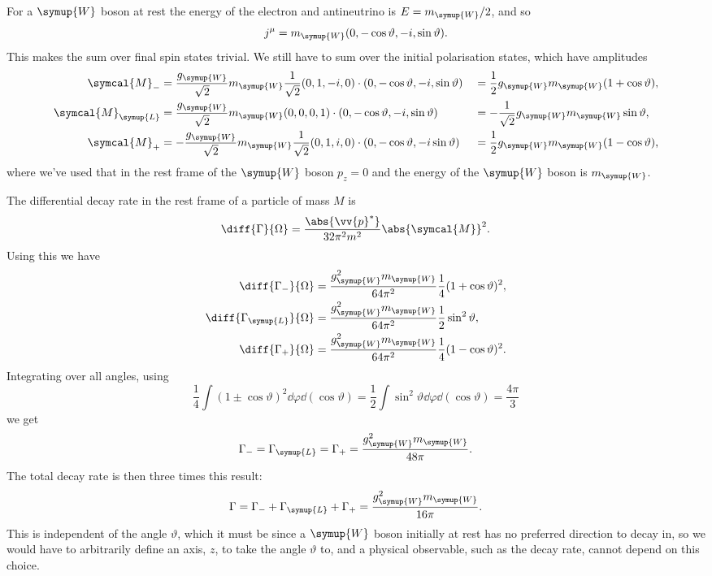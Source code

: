 \documentclass[fleqn]{NotesClass}
\newcommand{\Pparticle}[1]{\symup{#1}}
\newcommand{\PW}{\ensuremath{\Pparticle{W}}}
\newcommand{\amplitude}{\symcal{M}}
\begin{document}
    For a \PW{} boson at rest the energy of the electron and antineutrino is \(E = m_{\PW}/2\), and so
    \begin{equation}
        j^\mu = m_{\PW}(0, -\cos\vartheta, -i, \sin\vartheta).
    \end{equation}
    This makes the sum over final spin states trivial.
    We still have to sum over the initial polarisation states, which have amplitudes
    \begin{alignat*}{2}
        \amplitude_{-} &= \frac{g_{\PW}}{\sqrt{2}} m_{\PW} \frac{1}{\sqrt{2}} (0, 1, -i, 0) \cdot (0, -\cos\vartheta, -i, \sin\vartheta) &&= \frac{1}{2}g_{\PW}m_{\PW}(1 + \cos\vartheta),\\
        \amplitude_{\symup{L}} &= \frac{g_{\PW}}{\sqrt{2}} m_{\PW} (0, 0, 0, 1) \cdot (0, -\cos\vartheta, -i, \sin\vartheta) &&= -\frac{1}{\sqrt{2}} g_{\PW} m_{\PW} \sin\vartheta,\\
        \amplitude_{+} &= -\frac{g_{\PW}}{\sqrt{2}} m_{\PW} \frac{1}{\sqrt{2}} (0, 1, i, 0) \cdot (0, -\cos\vartheta, -i\sin\vartheta) &&= \frac{1}{2}g_{\PW}m_{\PW}(1 - \cos\vartheta),
    \end{alignat*}
    where we've used that in the rest frame of the \(\PW\) boson \(p_z = 0\) and the energy of the \PW{} boson is \(m_{\PW}\).
    
    The differential decay rate in the rest frame of a particle of mass \(M\) is
    \begin{equation}
        \diff{\Gamma}{\Omega} = \frac{\abs{\vv{p}^*}}{32\pi^2 m^2} \abs{\amplitude}^2.
    \end{equation}
    Using this we have
    \begin{align}
        \diff{\Gamma_{-}}{\Omega} &= \frac{g_{\PW}^2m_{\PW}}{64\pi^2} \frac{1}{4}(1 + \cos\vartheta)^2,\\
        \diff{\Gamma_{\symup{L}}}{\Omega} &= \frac{g_{\PW}^2m_{\PW}}{64\pi^2}\frac{1}{2}\sin^2\vartheta,\\
        \diff{\Gamma_{+}}{\Omega} &= \frac{g_{\PW}^2m_{\PW}}{64\pi^2} \frac{1}{4}(1 - \cos\vartheta)^2.
    \end{align}
    Integrating over all angles, using
    \begin{equation}
        \frac{1}{4} \int (1 \pm \cos\vartheta)^2 \dd{\varphi} \dd{(\cos\vartheta)} = \frac{1}{2} \int \sin^2\vartheta \dd{\varphi}\dd{(\cos\vartheta)} = \frac{4\pi}{3}
    \end{equation}
    we get
    \begin{equation}
        \Gamma_- = \Gamma_{\symup{L}} = \Gamma_{+} = \frac{g_{\PW}^2m_{\PW}}{48\pi}.
    \end{equation}
    The total decay rate is then three times this result:
    \begin{equation}
        \Gamma = \Gamma_- + \Gamma_{\symup{L}} + \Gamma_{+} = \frac{g_{\PW}^2m_{\PW}}{16\pi}.
    \end{equation}
    This is independent of the angle \(\vartheta\), which it must be since a \PW{} boson initially at rest has no preferred direction to decay in, so we would have to arbitrarily define an axis, \(z\), to take the angle \(\vartheta\) to, and a physical observable, such as the decay rate, cannot depend on this choice.
    
\end{document}
